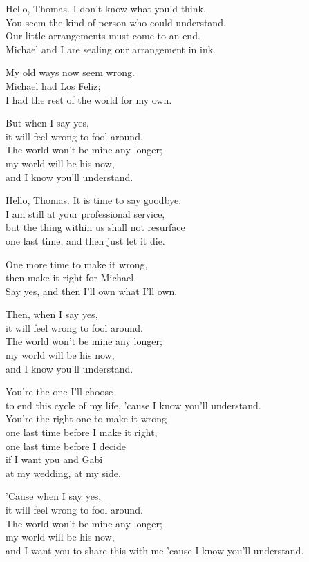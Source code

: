 \begin{lyrics}
Hello, Thomas. I don't know what you'd think.\\
You seem the kind of person who could understand.\\
Our little arrangements must come to an end.\\
Michael and I are sealing our arrangement in ink.

My old ways now seem wrong.\\
Michael had Los Feliz;\\
I had the rest of the world for my own.

But when I say yes,\\
it will feel wrong to fool around.\\
The world won't be mine any longer;\\
my world will be his now,\\
and I know you'll understand.

Hello, Thomas. It is time to say goodbye.\\
I am still at your professional service,\\
but the thing within us shall not resurface\\
one last time, and then just let it die.

One more time to make it wrong,\\
then make it right for Michael.\\
Say yes, and then I'll own what I'll own.

Then, when I say yes,\\
it will feel wrong to fool around.\\
The world won't be mine any longer;\\
my world will be his now,\\
and I know you'll understand.

You're the one I'll choose\\
to end this cycle of my life,
'cause I know you'll understand.\\
You're the right one to make it wrong\\
one last time before I make it right,\\
one last time before I decide\\
if I want you and Gabi\\
at my wedding, at my side.

'Cause when I say yes,\\
it will feel wrong to fool around.\\
The world won't be mine any longer;\\
my world will be his now,\\
and I want you to share this with me
'cause I know you'll understand.
\end{lyrics}

